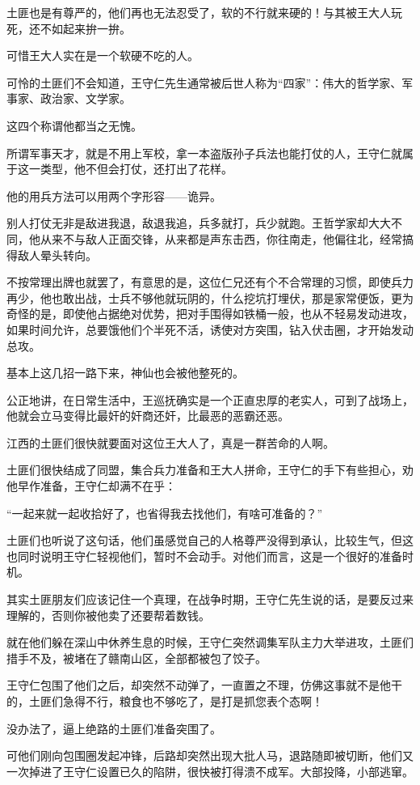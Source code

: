 \begin{multicols}{\theparacolNo}
土匪也是有尊严的，他们再也无法忍受了，软的不行就来硬的！与其被王大人玩死，还不如起来拚一拚。

可惜王大人实在是一个软硬不吃的人。

可怜的土匪们不会知道，王守仁先生通常被后世人称为“四家”：伟大的哲学家、军事家、政治家、文学家。

这四个称谓他都当之无愧。

所谓军事天才，就是不用上军校，拿一本盗版孙子兵法也能打仗的人，王守仁就属于这一类型，他不但会打仗，还打出了花样。

他的用兵方法可以用两个字形容——诡异。

别人打仗无非是敌进我退，敌退我追，兵多就打，兵少就跑。王哲学家却大大不同，他从来不与敌人正面交锋，从来都是声东击西，你往南走，他偏往北，经常搞得敌人晕头转向。

不按常理出牌也就罢了，有意思的是，这位仁兄还有个不合常理的习惯，即使兵力再少，他也敢出战，士兵不够他就玩阴的，什么挖坑打埋伏，那是家常便饭，更为奇怪的是，即使他占据绝对优势，把对手围得如铁桶一般，也从不轻易发动进攻，如果时间允许，总要饿他们个半死不活，诱使对方突围，钻入伏击圈，才开始发动总攻。

基本上这几招一路下来，神仙也会被他整死的。

公正地讲，在日常生活中，王巡抚确实是一个正直忠厚的老实人，可到了战场上，他就会立马变得比最奸的奸商还奸，比最恶的恶霸还恶。

江西的土匪们很快就要面对这位王大人了，真是一群苦命的人啊。

土匪们很快结成了同盟，集合兵力准备和王大人拼命，王守仁的手下有些担心，劝他早作准备，王守仁却满不在乎：

“一起来就一起收拾好了，也省得我去找他们，有啥可准备的？”

土匪们也听说了这句话，他们虽感觉自己的人格尊严没得到承认，比较生气，但这也同时说明王守仁轻视他们，暂时不会动手。对他们而言，这是一个很好的准备时机。

其实土匪朋友们应该记住一个真理，在战争时期，王守仁先生说的话，是要反过来理解的，否则你被他卖了还要帮着数钱。

就在他们躲在深山中休养生息的时候，王守仁突然调集军队主力大举进攻，土匪们措手不及，被堵在了赣南山区，全部都被包了饺子。

王守仁包围了他们之后，却突然不动弹了，一直置之不理，仿佛这事就不是他干的，土匪们急得不行，粮食也不够吃了，是打是抓您表个态啊！

没办法了，逼上绝路的土匪们准备突围了。

可他们刚向包围圈发起冲锋，后路却突然出现大批人马，退路随即被切断，他们又一次掉进了王守仁设置已久的陷阱，很快被打得溃不成军。大部投降，小部逃窜。


\end{multicols}

